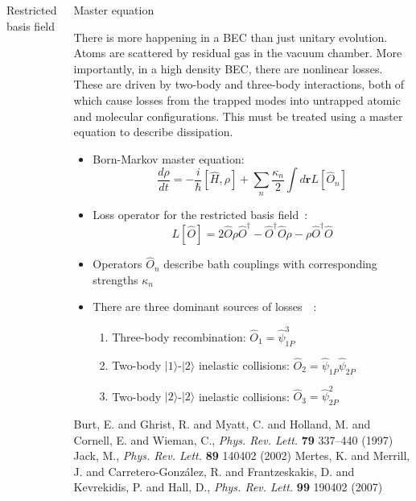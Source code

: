 \documentclass[final,hyperref={pdfpagelabels=false}]{beamer}
\begin{document}
\begin{frame}
\begin{columns}
{\begin{block}{Restricted basis field}
\end{block}

\begin{block}{Master equation}

There is more happening in a BEC than just unitary evolution.
Atoms are scattered by residual gas in the vacuum chamber.
More importantly, in a high density BEC, there are nonlinear losses.
These are driven by two-body and three-body interactions,
both of which cause losses from the trapped modes into untrapped atomic and molecular configurations.
This must be treated using a master equation to describe dissipation.

\begin{itemize}
	\item Born-Markov master equation:
	\[
		\frac{d\rho}{d t} = - \frac{i}{\hbar} [\hat{H}, \rho] +
		\sum\limits_n \frac{\kappa_n}{2} \int\limits d\mathbf{r} L [\hat{O}_n]
	\]
	\item Loss operator for the restricted basis field~\cite{jack}:
		\[ L [\hat{O}] = 2  \hat{O} \rho \hat{O}^\dagger - \hat{O}^\dagger \hat{O} \rho - \rho \hat{O}^\dagger \hat{O} \]
	\item Operators $\hat{O}_n$ describe bath couplings with corresponding strengths $\kappa_n$
	\item There are three dominant sources of losses~\cite{burt}~\cite{mertes}:
	\begin{enumerate}
		\item Three-body recombination: $\hat{O}_1 = \hat{\psi}_{1P}^3$
		\item Two-body $\vert1\rangle$-$\vert2\rangle$ inelastic collisions: $\hat{O}_2 = \hat{\psi}_{1P} \hat{\psi}_{2P}$
		\item Two-body $\vert2\rangle$-$\vert2\rangle$ inelastic collisions: $\hat{O}_3 = \hat{\psi}_{2P}^2$
	\end{enumerate}
\end{itemize}

\tiny{ \begin{thebibliography}{9}
	 Burt, E. and Ghrist, R. and Myatt, C. and Holland, M. and Cornell, E. and Wieman, C.,
		\textit{Phys. Rev. Lett.} \textbf{79} 337--440 (1997)
	 Jack, M., \textit{Phys. Rev. Lett.} \textbf{89} 140402 (2002)
	 Mertes, K. and Merrill, J. and Carretero-Gonz\'alez, R. and Frantzeskakis, D. and Kevrekidis, P. and Hall, D.,
		\textit{Phys. Rev. Lett.} \textbf{99} 190402 (2007)
\end{thebibliography} }


\end{block}}
\end{columns}
\end{frame}
\end{document}
